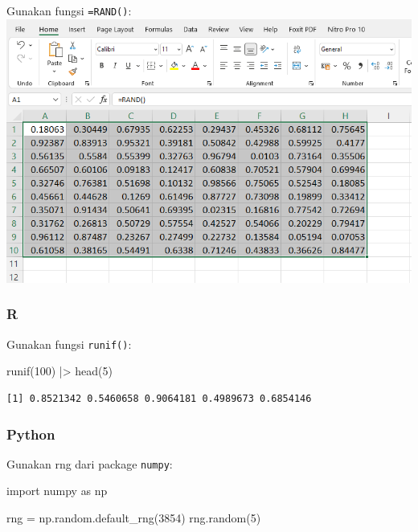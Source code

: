 \documentclass[
  letterpaper,
  DIV=11,
  numbers=noendperiod]{scrreprt}
\newenvironment{Shaded}{\begin{snugshade}}{\end{snugshade}}
\newcommand{\DecValTok}[1]{\textcolor[rgb]{0.68,0.00,0.00}{#1}}
\newcommand{\FunctionTok}[1]{\textcolor[rgb]{0.28,0.35,0.67}{#1}}
\newcommand{\ImportTok}[1]{\textcolor[rgb]{0.00,0.46,0.62}{#1}}
\newcommand{\NormalTok}[1]{\textcolor[rgb]{0.00,0.23,0.31}{#1}}
\newcommand{\OperatorTok}[1]{\textcolor[rgb]{0.37,0.37,0.37}{#1}}
\newcommand{\SpecialCharTok}[1]{\textcolor[rgb]{0.37,0.37,0.37}{#1}}
\begin{document}
Gunakan fungsi \texttt{=RAND()}: \includegraphics{./excel-rand.png}

\hypertarget{r}{%
\subsubsection{R}\label{r}}

Gunakan fungsi \texttt{runif()}:

\begin{Shaded}
\begin{Highlighting}[]
\FunctionTok{runif}\NormalTok{(}\DecValTok{100}\NormalTok{) }\SpecialCharTok{|\textgreater{}} \FunctionTok{head}\NormalTok{(}\DecValTok{5}\NormalTok{)}
\end{Highlighting}
\end{Shaded}

\begin{verbatim}
[1] 0.8521342 0.5460658 0.9064181 0.4989673 0.6854146
\end{verbatim}

\hypertarget{python}{%
\subsubsection{Python}\label{python}}

Gunakan rng dari package \texttt{numpy}:

\begin{Shaded}
\begin{Highlighting}[]
\ImportTok{import}\NormalTok{ numpy }\ImportTok{as}\NormalTok{ np}

\NormalTok{rng }\OperatorTok{=}\NormalTok{ np.random.default\_rng(}\DecValTok{3854}\NormalTok{)}
\NormalTok{rng.random(}\DecValTok{5}\NormalTok{)}
\end{Highlighting}
\end{Shaded}
\end{document}

